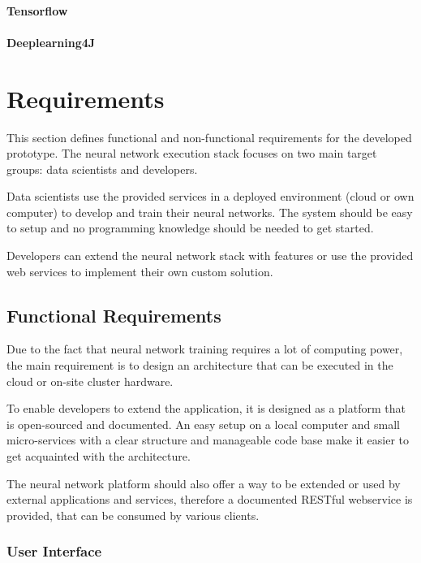 \subsubsection{Tensorflow}\label{tensorflow}

\subsubsection{Deeplearning4J}\label{deeplearning4j}

\chapter{Requirements}\label{requirements}

This section defines functional and non-functional requirements for the
developed prototype. The neural network execution stack focuses on two
main target groups: data scientists and developers.

Data scientists use the provided services in a deployed environment
(cloud or own computer) to develop and train their neural networks. The
system should be easy to setup and no programming knowledge should be
needed to get started.

Developers can extend the neural network stack with features or use the
provided web services to implement their own custom solution.

\section{Functional Requirements}\label{functional-requirements}

Due to the fact that neural network training requires a lot of computing
power, the main requirement is to design an architecture that can be
executed in the cloud or on-site cluster hardware.

To enable developers to extend the application, it is designed as a
platform that is open-sourced and documented. An easy setup on a local
computer and small micro-services with a clear structure and manageable
code base make it easier to get acquainted with the architecture.

The neural network platform should also offer a way to be extended or
used by external applications and services, therefore a documented
RESTful webservice is provided, that can be consumed by various clients.

\subsection{User Interface}\label{user-interface}

